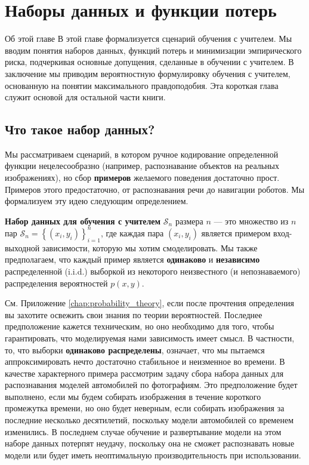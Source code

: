 \chapter{Наборы данных и функции потерь}
\label{chap:supervised_learning}

\begin{supportbox}{Об этой главе}
В этой главе формализуется сценарий обучения с учителем. Мы вводим понятия наборов данных, функций потерь и минимизации эмпирического риска, подчеркивая основные допущения, сделанные в обучении с учителем. В заключение мы приводим вероятностную формулировку обучения с учителем, основанную на понятии максимального правдоподобия. Эта короткая глава служит основой для остальной части книги.
\end{supportbox}

\section{Что такое набор данных?}
\label{sec:dataset}

Мы рассматриваем сценарий, в котором ручное кодирование определенной функции нецелесообразно (например, распознавание объектов на реальных изображениях), но сбор \textbf{примеров} желаемого поведения достаточно прост. Примеров этого предостаточно, от распознавания речи до навигации роботов. Мы формализуем эту идею следующим определением.

\begin{definition} \addbottle
\textbf{Набор данных для обучения с учителем} $\mathcal{S}_n$ размера $n$ — это множество из $n$ пар $\mathcal{S}_n = \left\{(x_i, y_i)\right\}_{i=1}^n$, где каждая пара $(x_i, y_i)$ является примером вход-выходной зависимости, которую мы хотим смоделировать. Мы также предполагаем, что каждый пример является \textbf{одинаково} и \textbf{независимо} распределенной (i.i.d.) выборкой из некоторого неизвестного (и непознаваемого) распределения вероятностей $p(x,y)$.
\end{definition}

См. Приложение \ref{chap:probability_theory}, если после прочтения определения вы захотите освежить свои знания по теории вероятностей. Последнее предположение кажется техническим, но оно необходимо для того, чтобы гарантировать, что моделируемая нами зависимость имеет смысл. В частности, то, что выборки \textbf{одинаково распределены}, означает, что мы пытаемся аппроксимировать нечто достаточно стабильное и неизменное во времени. В качестве характерного примера рассмотрим задачу сбора набора данных для распознавания моделей автомобилей по фотографиям. Это предположение будет выполнено, если мы будем собирать изображения в течение короткого промежутка времени, но оно будет неверным, если собирать изображения за последние несколько десятилетий, поскольку модели автомобилей со временем изменились. В последнем случае обучение и развертывание модели на этом наборе данных потерпят неудачу, поскольку она не сможет распознавать новые модели или будет иметь неоптимальную производительность при использовании.

